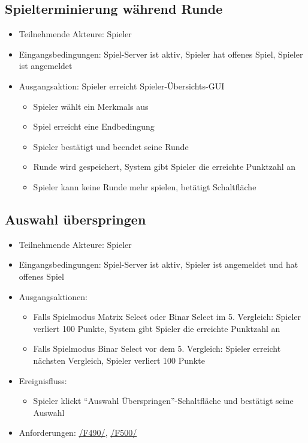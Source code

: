 \documentclass[a4paper]{scrreprt}
\begin{document}
	\subsection{Spielterminierung während Runde}
	\begin{itemize}
		\item Teilnehmende Akteure: \Gls{Spieler}
		\item Eingangsbedingungen: \Gls{Spiel-Server} ist aktiv, \Gls{Spieler} hat offenes \Gls{Spiel}, \Gls{Spieler} ist angemeldet
		\item Ausgangsaktion: \Gls{Spieler} erreicht Spieler-Übersichts-GUI
		\begin{itemize}
			\item \Gls{Spieler} wählt ein \Glspl{Merkmal} aus
			\item \Gls{Spiel} erreicht eine Endbedingung
			\item \Gls{Spieler} bestätigt und beendet seine Runde
			\item Runde wird gespeichert, System gibt \Gls{Spieler} die erreichte Punktzahl an
			\item \Gls{Spieler} kann keine Runde mehr spielen, betätigt Schaltfläche %
		\end{itemize}
	\end{itemize}

	\subsection{Auswahl überspringen}
	\begin{itemize}
		\item Teilnehmende Akteure: \Gls{Spieler}
		\item Eingangsbedingungen: \Gls{Spiel-Server} ist aktiv, \Gls{Spieler} ist angemeldet und hat offenes Spiel
        \item Ausgangsaktionen: \begin{itemize}
					\item Falls Spielmodus \Gls{Matrix Select} oder \Gls{Binar Select} im 5. Vergleich: Spieler verliert 100 Punkte, System gibt \Gls{Spieler} die erreichte Punktzahl an
					\item Falls Spielmodus \Gls{Binar Select} vor dem 5. Vergleich: Spieler erreicht nächsten Vergleich, Spieler verliert 100 Punkte
                    \end{itemize}
		\item Ereignisfluss:
		\begin{itemize}
			\item \Gls{Spieler} klickt \enquote{Auswahl Überspringen}-Schaltfläche und bestätigt seine Auswahl
		\end{itemize}
        \item Anforderungen: \hyperlink{F490}{/F490/}, \hyperlink{F500}{/F500/}
	\end{itemize}
\end{document}
